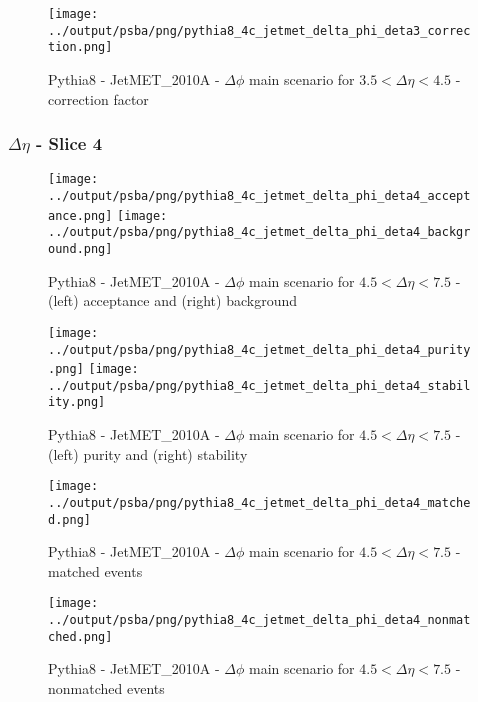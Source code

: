 \documentclass[11pt]{book}
\begin{document}
\begin{figure}[ht]
\centering
\texttt{[image: ../output/psba/png/pythia8\_4c\_jetmet\_delta\_phi\_deta3\_correction.png]}
\caption{Pythia8 - JetMET\_2010A - $\Delta\phi$ main scenario for $3.5 < \Delta\eta < 4.5$ - correction factor}
\label{fig:p8_jetmet_delta_phi_deta3_correction}
\end{figure}


\clearpage
\subsubsection{$\Delta\eta$ - Slice 4}

\begin{figure}[ht]
\centering
\texttt{[image: ../output/psba/png/pythia8\_4c\_jetmet\_delta\_phi\_deta4\_acceptance.png]}
\texttt{[image: ../output/psba/png/pythia8\_4c\_jetmet\_delta\_phi\_deta4\_background.png]}
\caption{Pythia8 - JetMET\_2010A - $\Delta\phi$ main scenario for $4.5 < \Delta\eta < 7.5$ - (left) acceptance and (right) background}
\label{fig:p8_jetmet_delta_phi_deta4_ab}
\end{figure}

\begin{figure}[ht]
\centering
\texttt{[image: ../output/psba/png/pythia8\_4c\_jetmet\_delta\_phi\_deta4\_purity.png]}
\texttt{[image: ../output/psba/png/pythia8\_4c\_jetmet\_delta\_phi\_deta4\_stability.png]}
\caption{Pythia8 - JetMET\_2010A - $\Delta\phi$ main scenario for $4.5 < \Delta\eta < 7.5$ - (left) purity and (right) stability}
\label{fig:p8_jetmet_delta_phi_deta4_ps}
\end{figure}

\begin{figure}[ht]
\centering
\texttt{[image: ../output/psba/png/pythia8\_4c\_jetmet\_delta\_phi\_deta4\_matched.png]}
\caption{Pythia8 - JetMET\_2010A - $\Delta\phi$ main scenario for $4.5 < \Delta\eta < 7.5$ - matched events}
\label{fig:p8_jetmet_delta_phi_deta4_matched}
\end{figure}

\begin{figure}[ht]
\centering
\texttt{[image: ../output/psba/png/pythia8\_4c\_jetmet\_delta\_phi\_deta4\_nonmatched.png]}
\caption{Pythia8 - JetMET\_2010A - $\Delta\phi$ main scenario for $4.5 < \Delta\eta < 7.5$ - nonmatched events}
\label{fig:p8_jetmet_delta_phi_deta4_nonmatched}
\end{figure}
\end{document}
